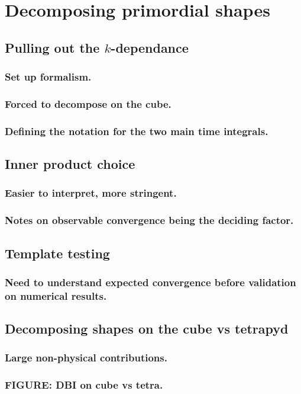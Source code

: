 %
\chapter{Decomposing primordial shapes}
\section{Pulling out the $k$-dependance}
    \subsection{Set up formalism.}
    \subsection{Forced to decompose on the cube.}
    \subsection{Defining the notation for the two main time integrals.}
\section{Inner product choice}
    \subsection{Easier to interpret, more stringent.}
    \subsection{Notes on observable convergence being the deciding factor.}
\section{Template testing}
    \subsection{Need to understand expected convergence before validation on numerical results.}
\section{Decomposing shapes on the cube vs tetrapyd}
    \subsection{Large non-physical contributions.}
    \subsection{FIGURE: DBI on cube vs tetra.}
